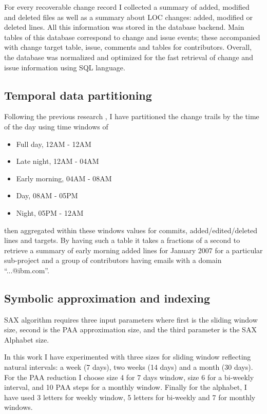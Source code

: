 \documentclass[10pt, conference, compsocconf]{IEEEtran}
\begin{document}
For every recoverable change record I collected a summary of added, modified and deleted files 
as well as a summary about LOC changes: added, modified or deleted lines. All this information 
was stored in the database backend. Main tables of this database correspond to change 
and issue events; these accompanied with change target table, issue, comments and 
tables for contributors. Overall, the database was normalized and optimized for the fast 
retrieval of change and issue information using SQL language.

\subsection{Temporal data partitioning}
Following the previous research \cite{citeulike:10392277}, I have partitioned the 
change trails by the time of the day using time windows of
\begin{itemize}
 \item Full day, 12AM - 12AM
    \item Late night, 12AM - 04AM  
    \item Early morning, 04AM - 08AM  
    \item Day, 08AM - 05PM  
    \item Night, 05PM - 12AM
\end{itemize}
then aggregated within these windows values for commits, added/edited/deleted 
lines and targets. By having such a table it takes a fractions of a second to retrieve 
a summary of early morning added lines for January 2007 for a particular sub-project and
a group of contributors having emails with a domain ``...@ibm.com''.

\subsection{Symbolic approximation and indexing}
SAX algorithm requires three input parameters where first is the sliding window size, 
second is the PAA approximation size, and the third parameter is the SAX Alphabet size.

In this work I have experimented with three sizes for sliding window reflecting natural 
intervals: a week (7 days), two weeks (14 days) and a month (30 days).
For the PAA reduction I choose size 4 for 7 days window, size 6 for a bi-weekly interval,
and 10 PAA steps for a monthly window. Finally for the alphabet, I have used 3 letters for 
weekly window, 5 letters for bi-weekly and 7 for monthly windows.
\end{document}
